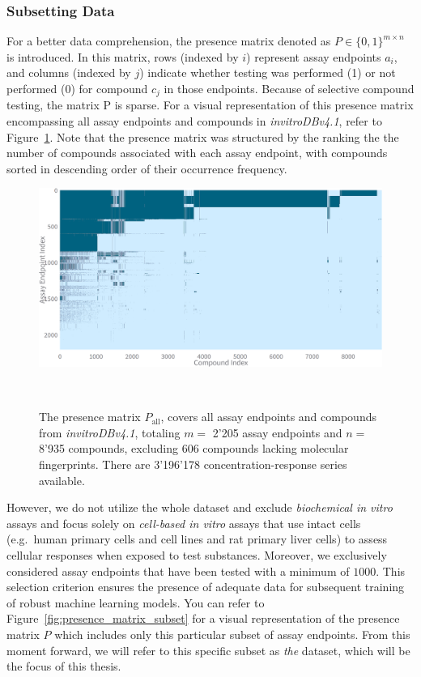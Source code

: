 \subsubsection{Subsetting Data}
For a better data comprehension, the presence matrix denoted as $P \in {\{0, 1\}}^{m \times n}$ is introduced. In this matrix, rows (indexed by $i$) represent assay endpoints $a_i$, and columns (indexed by $j$) indicate whether testing was performed (1) or not performed (0) for compound $c_j$ in those endpoints. Because of selective compound testing, the matrix P is sparse. For a visual representation of this presence matrix encompassing all assay endpoints and compounds in \textit{invitroDBv4.1}, refer to Figure~\ref{fig:presence_matrix_all}. Note that the presence matrix was structured by the ranking the the number of compounds associated with each assay endpoint, with compounds sorted in descending order
of their occurrence frequency.

\begin{figure}[h]
    \centering
    \includegraphics[width=1.0\textwidth]{figures/presence_matrix_all.png}
    \caption{The presence matrix $P_{\text{all}}$, covers all assay endpoints and compounds from \emph{invitroDBv4.1}, totaling $m =$ 2'205 assay endpoints and $n =$ 8'935 compounds, excluding 606 compounds lacking molecular fingerprints. There are 3'196'178 concentration-response series available.}
~\label{fig:presence_matrix_all}
\end{figure}

However, we do not utilize the whole dataset and exclude \emph{biochemical in vitro} assays and focus solely on \emph{cell-based in vitro} assays that use intact cells (e.g.\ human primary cells and cell lines and rat primary liver cells) to assess cellular responses when exposed to test substances. 
Moreover, we exclusively considered assay endpoints that have been tested with a minimum of $\num{1000}$. This selection criterion ensures the presence of adequate data for subsequent training of robust machine learning models. You can refer to Figure~\ref{fig:presence_matrix_subset} for a visual representation of the presence matrix $P$ which includes only this particular subset of assay endpoints. From this moment forward, we will refer to this specific subset as \emph{the} dataset, which will be the focus of this thesis. 

